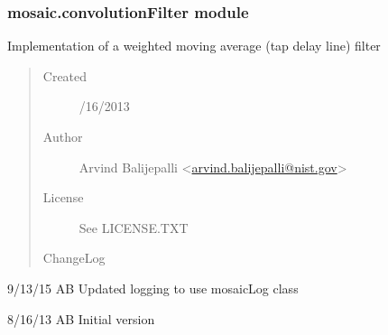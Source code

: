 \documentclass[letterpaper,10pt,english]{sphinxmanual}
\begin{document}
\subsubsection{mosaic.convolutionFilter module}
\label{api-doc/mosaic.filter:mosaic-convolutionfilter-module}\label{api-doc/mosaic.filter:module-mosaic.convolutionFilter}
Implementation of a weighted moving average (tap delay line) filter
\begin{quote}\begin{description}
\item[{Created}] /16/2013

\item[{Author}] \leavevmode
Arvind Balijepalli \textless{}\href{mailto:arvind.balijepalli@nist.gov}{arvind.balijepalli@nist.gov}\textgreater{}

\item[{License}] \leavevmode
See LICENSE.TXT

\item[{ChangeLog}] \leavevmode
\end{description}\end{quote}

\begin{DUlineblock}{0em}
\item[] 9/13/15         AB      Updated logging to use mosaicLog class
\item[] 8/16/13         AB      Initial version
\end{DUlineblock}
\end{document}
